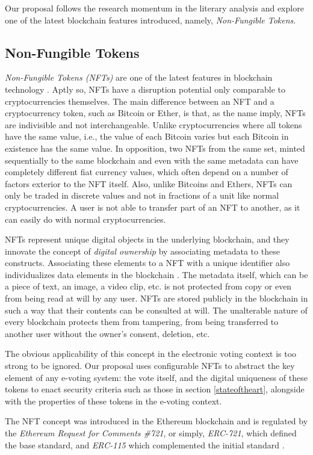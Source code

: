 Our proposal follows the research momentum in the literary analysis and explore one of the latest blockchain features introduced, namely, \textit{Non-Fungible Tokens}.
    
    \subsection{Non-Fungible Tokens}
    \textit{Non-Fungible Tokens (NFTs)} are one of the latest features in blockchain technology \cite{Valeonti2021}. Aptly so, NFTs have a disruption potential only comparable to cryptocurrencies themselves. The main difference between an NFT and a cryptocurrency token, such as Bitcoin or Ether, is that, as the name imply, NFTs are indivisible and not interchangeable. Unlike cryptocurrencies where all tokens have the same value, i.e., the value of each Bitcoin varies but each Bitcoin in existence has the same value. In opposition, two NFTs from the same set, minted sequentially to the same blockchain and even with the same metadata can have completely different fiat currency values, which often depend on a number of factors exterior to the NFT itself. Also, unlike Bitcoins and Ethers, NFTs can only be traded in discrete values and not in fractions of a unit like normal cryptocurrencies. A user is not able to transfer part of an NFT to another, as it can easily do with normal cryptocurrencies. 
    \par
    NFTs represent unique digital objects in the underlying blockchain, and they innovate the concept of \textit{digital ownership} by associating metadata to these constructs. Associating these elements to a NFT with a unique identifier also individualizes data elements in the blockchain \cite{Fairfield2021}. The metadata itself, which can be a piece of text, an image, a video clip, etc. is not protected from copy or even from being read at will by any user. NFTs are stored publicly in the blockchain in such a way that their contents can be consulted at will. The unalterable nature of every blockchain protects them from tampering, from being transferred to another user without the owner's consent, deletion, etc.
    \par
    The obvious applicability of this concept in the electronic voting context is too strong to be ignored. Our proposal uses configurable NFTs to abstract the key element of any e-voting system: the vote itself, and the digital uniqueness of these tokens to enact security criteria such as those in section \ref{stateoftheart}, alongside with the properties of these tokens in the e-voting context.
    \par
    The NFT concept was introduced in the Ethereum blockchain and is regulated by the \textit{Ethereum Request for Comments \#721}, or simply, \textit{ERC-721}, which defined the base standard, and \textit{ERC-115} which complemented the initial standard \cite{Ali2023}.
    \par
        
